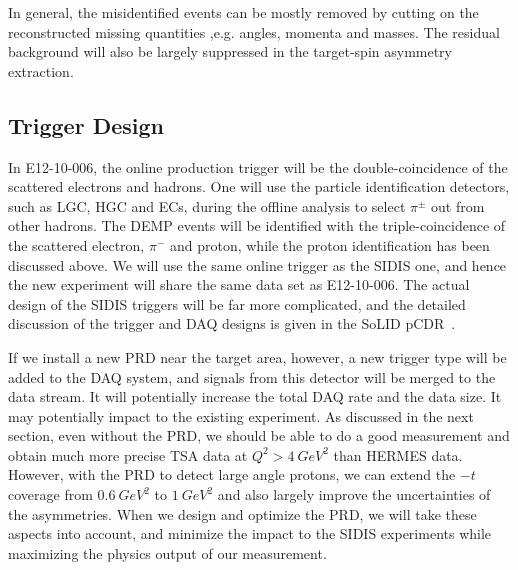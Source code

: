 In general, the misidentified events can be mostly removed by cutting on the reconstructed missing quantities ,e.g. angles, momenta and masses. The residual background will also be largely suppressed in the target-spin asymmetry extraction. 

\subsection{Trigger Design}
In E12-10-006, the online production trigger will be the double-coincidence of
the scattered electrons and hadrons. One will use the particle identification
detectors, such as LGC, HGC and ECs, during the offline analysis to select
$\pi^{\pm}$ out from other hadrons. The DEMP events will be identified with the
triple-coincidence of the scattered electron, $\pi^{-}$ and proton, while the proton identification has been discussed above. We
will use the same online trigger as the SIDIS one, and hence the new experiment
will share the same data set as E12-10-006. The actual design of the SIDIS triggers will be far more complicated, and the detailed discussion of the trigger and DAQ designs is given in the SoLID pCDR~\cite{solid_pcdr}.

If we install a new PRD near the target area, however, a new trigger type will be added to the DAQ system, and signals from this detector will be merged to the data stream. It will potentially increase the total DAQ rate and the data size. It may potentially impact to the existing experiment.  As discussed in the next section, even without the PRD, we should be able to do a good measurement and obtain much more precise TSA data at $Q^{2}>4~GeV^{2}$ than HERMES data. However, with the PRD to detect large angle protons, we can extend the $-t$ coverage from $0.6~GeV^{2}$ to $1~GeV^{2}$ and also largely improve the uncertainties of the asymmetries. When we design and optimize the PRD, we will take these aspects into account, and minimize the impact to the SIDIS experiments while maximizing the physics output of our measurement.